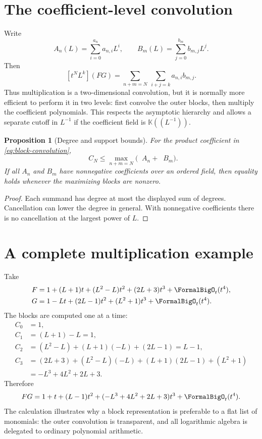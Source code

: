 \documentclass[11pt,oneside]{book}
\newtheorem{proposition}[theorem]{Proposition}
\theoremstyle{definition}
\theoremstyle{remark}
\DeclareMathOperator{\degL}{deg_{\!L}}
\newcommand{\K}{\mathbb K}
\begin{document}
\section{The coefficient-level convolution}
Write
\[
 A_n(L)=\sum_{i=0}^{a_n}a_{n,i}L^i,
 \qquad
 B_m(L)=\sum_{j=0}^{b_m}b_{m,j}L^j.
\]
Then
\begin{equation}\label{eq:two-dimensional-convolution}
 [t^NL^k](FG)
 =\sum_{n+m=N}\ \sum_{i+j=k}a_{n,i}b_{m,j}.
\end{equation}
Thus multiplication is a two-dimensional convolution, but it is normally
more efficient to perform it in two levels: first convolve the outer blocks,
then multiply the coefficient polynomials.  This respects the asymptotic
hierarchy and allows a separate cutoff in $L^{-1}$ if the coefficient field is
$\K((L^{-1}))$.

\begin{proposition}[Degree and support bounds]\label{prop:degree-bounds}
For the product coefficient in \eqref{eq:block-convolution},
\[
 \degL C_N\le
 \max_{n+m=N}\bigl(\degL A_n+\degL B_m\bigr).
\]
If all $A_n$ and $B_m$ have nonnegative coefficients over an ordered field,
then equality holds whenever the maximizing blocks are nonzero.
\end{proposition}
\begin{proof}
Each summand has degree at most the displayed sum of degrees.  Cancellation
can lower the degree in general.  With nonnegative coefficients there is no
cancellation at the largest power of $L$.
\end{proof}

\section{A complete multiplication example}
Take
\begin{align*}
 F&=1+(L+1)t+(L^2-L)t^2+(2L+3)t^3+\FormalBigO_t(t^4),\\
 G&=1-Lt+(2L-1)t^2+(L^2+1)t^3+\FormalBigO_t(t^4).
\end{align*}
The blocks are computed one at a time:
\begin{align*}
 C_0&=1,\\
 C_1&=(L+1)-L=1,\\
 C_2&=(L^2-L)+(L+1)(-L)+(2L-1)
      =L-1,\\
 C_3&=(2L+3)+(L^2-L)(-L)+(L+1)(2L-1)+(L^2+1)\\
    &=-L^3+4L^2+2L+3.
\end{align*}
Therefore
\begin{equation}\label{eq:product-example}
 FG=1+t+(L-1)t^2+(-L^3+4L^2+2L+3)t^3+\FormalBigO_t(t^4).
\end{equation}
The calculation illustrates why a block representation is preferable to a
flat list of monomials: the outer convolution is transparent, and all
logarithmic algebra is delegated to ordinary polynomial arithmetic.
\end{document}
